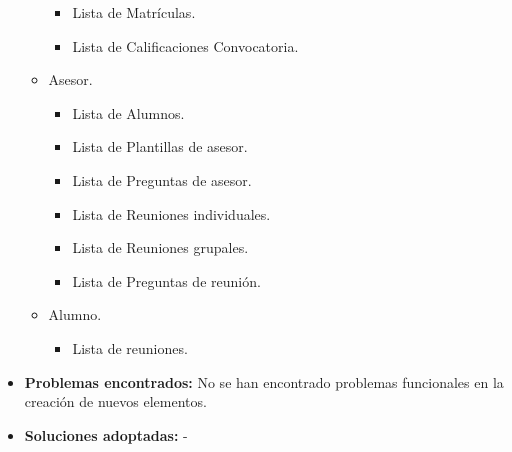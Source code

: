 \begin{itemize}
\begin{itemize}
\begin{itemize}
        \item Lista de Matrículas.
        \item Lista de Calificaciones Convocatoria.
      \end{itemize}
      \item Asesor.
      \begin{itemize}
        \item Lista de Alumnos.
        \item Lista de Plantillas de asesor.
        \item Lista de Preguntas de asesor.
        \item Lista de Reuniones individuales.
        \item Lista de Reuniones grupales.
        \item Lista de Preguntas de reunión.
      \end{itemize}
      \item Alumno.
      \begin{itemize}
        \item Lista de reuniones.
      \end{itemize}
    \end{itemize}

    \item \textbf{Problemas encontrados:} No se han encontrado problemas
    funcionales en la creación de nuevos elementos.
    \item \textbf{Soluciones adoptadas:} -
  \end{itemize}
